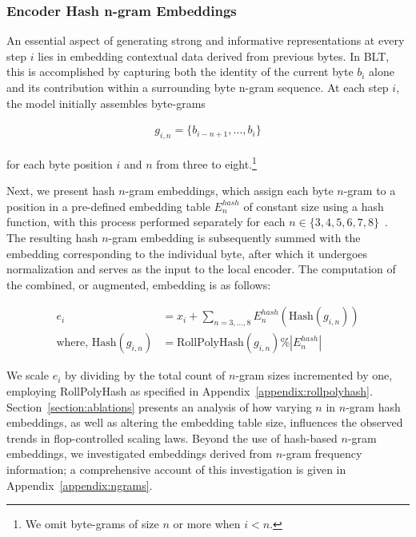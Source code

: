 \subsubsection{Encoder Hash n-gram Embeddings}
\label{sec:ngram-emb}
\label{sec:hash-emb}
An essential aspect of generating strong and informative representations at every step $i$ lies in embedding contextual data derived from previous bytes. In {\textsc BLT}, this is accomplished by capturing both the identity of the current byte $b_i$ alone and its contribution within a surrounding byte n-gram sequence. At each step $i$, the model initially assembles byte-grams

\begin{align}
    g_{i,n}=\{b_{i-n + 1},\ldots, b_i\}
\end{align}

for each byte position $i$ and $n$ from three to eight.\footnote{
We omit byte-grams of size $n$ or more when $i<n$. }

Next, we present hash $n$-gram embeddings, which assign each byte $n$-gram to a position in a pre-defined embedding table $E_{n}^{hash}$ of constant size using a hash function, with this process performed separately for each $n \in\{3,4,5,6,7,8\}$~\citep{bai2010learning}. The resulting hash $n$-gram embedding is subsequently summed with the embedding corresponding to the individual byte, after which it undergoes normalization and serves as the input to the local encoder. The computation of the combined, or augmented, embedding is as follows:

\begin{align}
e_i &= x_i + \sum_{n = 3,...,8}E_{n}^{hash}(\text{Hash}(g_{i,n})) \\
\text{where, Hash}(g_{i,n}) &= \text{RollPolyHash}(g_{i,n}) \% |E_{n}^{hash}|
\end{align}

We scale $e_i$ by dividing by the total count of $n$-gram sizes incremented by one, employing RollPolyHash as specified in Appendix~\ref{appendix:rollpolyhash}. Section~\ref{section:ablations} presents an analysis of how varying $n$ in $n$-gram hash embeddings, as well as altering the embedding table size, influences the observed trends in flop-controlled scaling laws. Beyond the use of hash-based $n$-gram embeddings, we investigated embeddings derived from $n$-gram frequency information; a comprehensive account of this investigation is given in Appendix~\ref{appendix:ngrams}.


